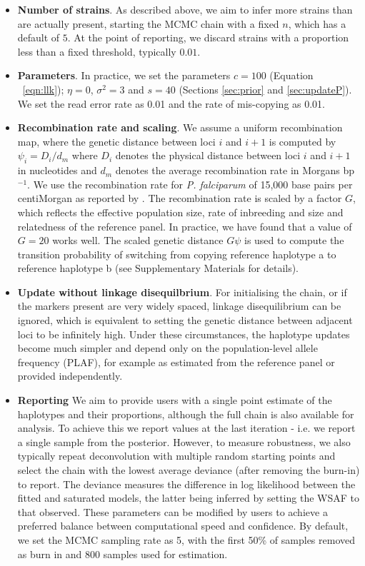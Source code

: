 \documentclass{nature}
\begin{document}
\begin{itemize}
\item {\bf Number of strains}. As described above, we aim to infer more strains than are actually present, starting the MCMC chain with a fixed $n$, which has a default of $5$. At the point of reporting, we discard strains with a proportion less than a fixed threshold, typically $0.01$.

\item {\bf Parameters}. In practice, we set the parameters $c=100$ (Equation ~\eqref{eqn:llk}); $\eta = 0$, $\sigma^2 = 3$ and $s=40$ (Sections \ref{sec:prior} and \ref{sec:updateP}).  We set the read error rate as 0.01 and the rate of mis-copying as 0.01.

\item {\bf Recombination rate and scaling}. We assume a uniform recombination map, where the genetic distance between loci $i$ and $i+1$ is computed by $\psi_i = D_i / d_m$ where $D_i$ denotes the physical distance between loci $i$ and $i+1$ in nucleotides and $d_m$ denotes the average recombination rate in Morgans bp$^{-1}$. We use the recombination rate for {\it P. falciparum} of 15,000 base pairs per centiMorgan as reported by \cite{Miles2016}. The recombination rate is scaled by a factor $G$, which reflects the effective population size, rate of inbreeding and size and relatedness of the reference panel.  In practice, we have found that a value of $G=20$ works well.  The scaled genetic distance $G\psi$ is used to compute the transition probability of switching from copying reference haplotype a to reference haplotype b (see Supplementary Materials for details).

\item {\bf Update without linkage disequilbrium}. For initialising the chain, or if the markers present are very widely spaced, linkage disequilibrium can be ignored, which is equivalent to setting the genetic distance between adjacent loci to be infinitely high.  Under these circumstances, the haplotype updates become much simpler and depend only on the population-level allele frequency (PLAF), for example as estimated from the reference panel or provided independently.

\item {\bf Reporting} We aim to provide users with a single point estimate of the haplotypes and their proportions, although the full chain is also available for analysis.  To achieve this we report values at the last iteration - i.e. we report a single sample from the posterior.  However, to measure robustness, we also typically repeat deconvolution with multiple random starting points and select the chain with the lowest average deviance (after removing the burn-in) to report. The deviance measures the difference in log likelihood between the fitted and saturated models, the latter being inferred by setting the WSAF to that observed.   These parameters can be modified by users to achieve a preferred balance between computational speed and confidence.  By default, we set the MCMC sampling rate as 5, with the first 50\% of samples removed as burn in and 800 samples used for estimation.


\end{itemize}
\end{document}
